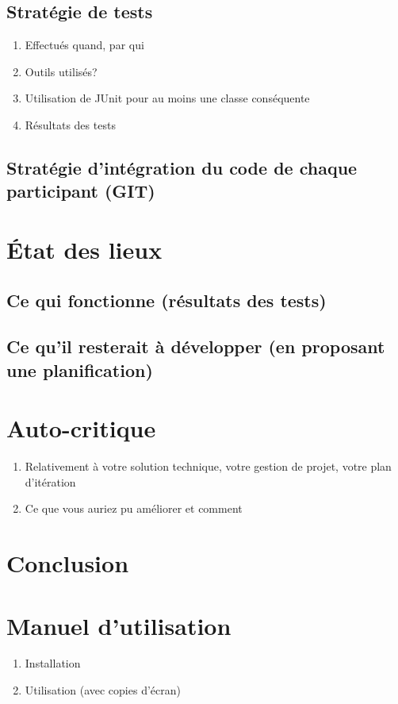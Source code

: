 \documentclass[a4paper,11pt]{article}
\begin{document}
	\subsection{Stratégie de tests}
	\begin{enumerate}
		\item Effectués quand, par qui
		\item Outils utilisés?
		\item Utilisation de JUnit pour au moins une classe conséquente
		\item Résultats des tests
	\end{enumerate}

	\subsection{Stratégie d'intégration du code de chaque participant (GIT)}


	\section{État des lieux}
	
	
	\subsection{Ce qui fonctionne (résultats des tests)}
	
	\subsection{Ce qu'il resterait à développer (en proposant une planification)}
	
	
	\section{Auto-critique}
	
	
	\begin{enumerate}
		\item Relativement à votre solution technique, votre gestion de projet, votre plan d'itération
		\item Ce que vous auriez pu améliorer et comment
	\end{enumerate}


	\section{Conclusion}
	
	
	\appendix
	\section{Manuel d'utilisation} \label{app:manuelUtil}
	\begin{enumerate}
		\item Installation
		\item Utilisation (avec copies d'écran)
	\end{enumerate}
\end{document}
